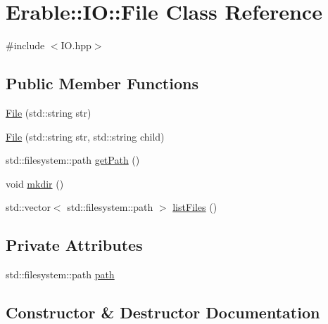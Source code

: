 \hypertarget{class_erable_1_1_i_o_1_1_file}{}\section{Erable\+::IO\+::File Class Reference}
\label{class_erable_1_1_i_o_1_1_file}


{\ttfamily \#include $<$I\+O.\+hpp$>$}

\subsection*{Public Member Functions}
\begin{DoxyCompactItemize}
\item 
\mbox{\hyperlink{class_erable_1_1_i_o_1_1_file_a1081c07bd92ad5d67de5206bef5d9ee0}{File}} (std\+::string str)
\item 
\mbox{\hyperlink{class_erable_1_1_i_o_1_1_file_a1032497e721249b1cacfce0daf8d6cac}{File}} (std\+::string str, std\+::string child)
\item 
std\+::filesystem\+::path \mbox{\hyperlink{class_erable_1_1_i_o_1_1_file_a255ebefb8041926d528beb0436838363}{get\+Path}} ()
\item 
void \mbox{\hyperlink{class_erable_1_1_i_o_1_1_file_ab3690b8b34c69e5fdeaa1919e0c2d65d}{mkdir}} ()
\item 
std\+::vector$<$ std\+::filesystem\+::path $>$ \mbox{\hyperlink{class_erable_1_1_i_o_1_1_file_ab036bd4a721872729f009005d4945027}{list\+Files}} ()
\end{DoxyCompactItemize}
\subsection*{Private Attributes}
\begin{DoxyCompactItemize}
\item 
std\+::filesystem\+::path \mbox{\hyperlink{class_erable_1_1_i_o_1_1_file_a9d9de3ccaf380aa8bd01338440a937cf}{path}}
\end{DoxyCompactItemize}


\subsection{Constructor \& Destructor Documentation}
\mbox{\label{class_erable_1_1_i_o_1_1_file_a1081c07bd92ad5d67de5206bef5d9ee0}} 
